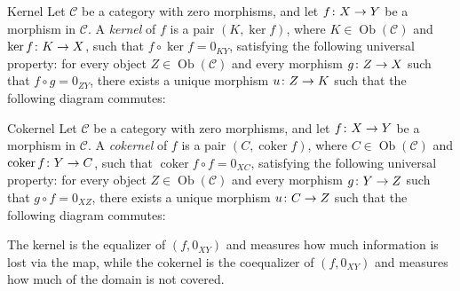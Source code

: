 \documentclass[a4paper]{article}
\begin{document}
\begin{snippetdefinition}{Kernel}
    Let \(\mathcal C\) be a category with zero morphisms, and let \(f \colon X \to Y\) be a morphism in \(\mathcal C\).
    A \emph{kernel} of \(f\) is a pair \((K, \ker f)\), where \(K \in \operatorname{Ob}(\mathcal C)\) and \(\ker f \colon K \to X\), such that \(f \circ \ker f = 0_{KY}\), satisfying the following universal property:
    for every object \(Z \in \operatorname{Ob}(\mathcal C)\) and every morphism \(g \colon Z \to X\) such that \(f \circ g = 0_{ZY}\), there exists a unique morphism \(u \colon Z \to K\) such that the following diagram commutes:
    \begin{center}
    \end{center}
\end{snippetdefinition}

\begin{snippetdefinition}{Cokernel}
    Let \(\mathcal C\) be a category with zero morphisms, and let \(f \colon X \to Y\) be a morphism in \(\mathcal C\).
    A \emph{cokernel} of \(f\) is a pair \((C, \operatorname{coker} f)\), where \(C \in \operatorname{Ob}(\mathcal C)\) and \(\operatorname{coker} f \colon Y \to C\), such that \(\operatorname{coker} f \circ f = 0_{XC}\), satisfying the following universal property:
    for every object \(Z \in \operatorname{Ob}(\mathcal C)\) and every morphism \(g \colon Y \to Z\) such that \(g \circ f = 0_{XZ}\), there exists a unique morphism \(u \colon C \to Z\) such that the following diagram commutes:
    \begin{center}
    \end{center}
\end{snippetdefinition}

The kernel is the equalizer of \((f, 0_{XY})\)
and measures how much information is lost via the map,
while the cokernel is the coequalizer of \((f, 0_{XY})\)
and measures how much of the domain is not covered.
\end{document}

